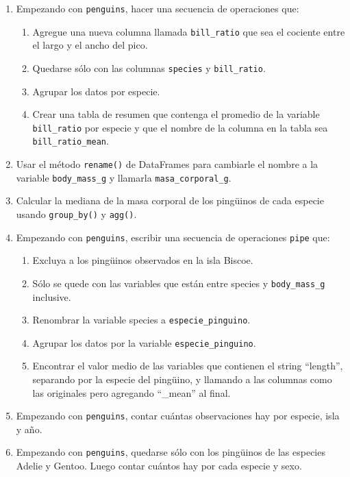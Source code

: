 \documentclass[a4paper,11pt]{article}
\theoremstyle{definition}
\begin{document}
\begin{enumerate}
\item Empezando con \lstinline{penguins}, hacer una secuencia de operaciones que:
\begin{enumerate}
\item Agregue una nueva columna llamada \lstinline{bill_ratio} que sea el cociente entre el largo y el ancho del pico.
\item Quedarse sólo con las columnas \lstinline{species} y \lstinline{bill_ratio}.
\item Agrupar los datos por especie.
\item Crear una tabla de resumen que contenga el promedio de la variable \lstinline{bill_ratio} por especie y que el nombre de la columna en la tabla sea \lstinline{bill_ratio_mean}.
\end{enumerate}

\item Usar el método \lstinline{rename()} de DataFrames para cambiarle el nombre a la variable \lstinline{body_mass_g} y llamarla \lstinline{masa_corporal_g}.

\item Calcular la mediana de la masa corporal de los ping\"uinos de cada especie usando \lstinline{group_by()} y \lstinline{agg()}.

\item Empezando con \lstinline{penguins}, escribir una secuencia de operaciones \lstinline{pipe} que:
\begin{enumerate}
\item Excluya a los ping\"uinos observados en la isla Biscoe.
\item Sólo se quede con las variables que están entre species y \lstinline{body_mass_g} inclusive.
\item Renombrar la variable species a \lstinline{especie_pinguino}.
\item Agrupar los datos por la variable \lstinline{especie_pinguino}.
\item Encontrar el valor medio de las variables que contienen el string ``length'', separando por la especie del ping\"uino, y llamando a las columnas como las originales pero agregando ``\_mean'' al final.
\end{enumerate}

\item Empezando con \lstinline{penguins}, contar cuántas observaciones hay por especie, isla y año.

\item Empezando con \lstinline{penguins}, quedarse sólo con los ping\"uinos de las especies Adelie y Gentoo. Luego contar cuántos hay por cada especie y sexo.


\end{enumerate}
\end{document}
